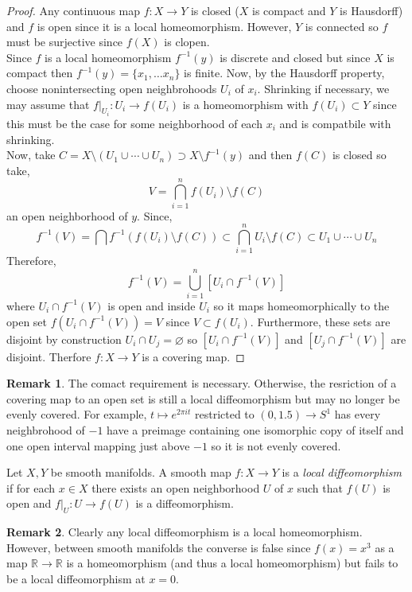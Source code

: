 \documentclass[12pt]{extarticle}
\newcommand{\R}{\mathbb{R}}
\theoremstyle{definition}
\newtheorem{remark}{Remark}
\newenvironment{definition}[1][Definition:]{\begin{trivlist}
\item[\hskip \labelsep {\bfseries #1}]}{\end{trivlist}}
\begin{document}
\begin{proof}
Any continuous map $f : X \to Y$ is closed ($X$ is compact and $Y$ is Hausdorff) and $f$ is open since it is a local homeomorphism. However, $Y$ is connected so $f$ must be surjective since $f(X)$ is clopen. 
\bigskip\\
Since $f$ is a local homeomorphism $f^{-1}(y)$ is discrete and closed but since $X$ is compact then $f^{-1}(y) = \{ x_1, \dots x_n \}$ is finite. Now, by the Hausdorff property, choose nonintersecting open neighbrohoods $U_i$ of $x_i$. Shrinking if necessary, we may assume that $f|_{U_i} : U_i \to f(U_i)$ is a homeomorphism with $f(U_i) \subset Y$ since this must be the case for some neighborhood of each $x_i$ and is compatbile with shrinking.  
\bigskip\\
Now, take $C = X \setminus (U_1 \cup \cdots \cup U_n) \supset X \setminus f^{-1}(y)$ and then $f(C)$ is closed so take,
\[ V = \bigcap_{i = 1}^n f(U_i) \setminus f(C) \]
an open neighborhood of $y$. Since,
\[ f^{-1}(V) = \bigcap f^{-1}(f(U_i) \setminus f(C)) \subset \bigcap_{i = 1}^n U_i \setminus f(C) \subset U_1 \cup \cdots \cup U_n \]
Therefore,
\[ f^{-1}(V) = \bigcup_{i = 1}^n [U_i \cap f^{-1}(V)] \]
where $U_i \cap f^{-1}(V)$ is open and inside $U_i$ so it maps homeomorphically to the open set $f(U_i \cap f^{-1}(V)) = V$ since $V \subset f(U_i)$. Furthermore, these sets are disjoint by construction $U_i \cap U_j = \varnothing$ so $[U_i \cap f^{-1}(V)]$ and $[U_j \cap f^{-1}(V)]$ are disjoint. Therfore $f : X \to Y$ is a covering map.
\end{proof}

\begin{remark}
The comact requirement is necessary. Otherwise, the resriction of a covering map to an open set is still a local diffeomorphism but may no longer be evenly covered. For example, $t \mapsto e^{2 \pi i t}$ restricted to $(0, 1.5) \to S^1$ has every neighbrohood of $-1$ have a preimage containing one isomorphic copy of itself and one open interval mapping just above $-1$ so it is not evenly covered.
\end{remark}

\begin{definition}
Let $X, Y$ be smooth manifolds. A smooth map $f : X \to Y$ is a \textit{local diffeomorphism} if for each $x \in X$ there exists an open neighborhood $U$ of $x$ such that $f(U)$ is open and $f|_U : U \to f(U)$ is a diffeomorphism.
\end{definition}

\begin{remark}
Clearly any local diffeomorphism is a local homeomorphism. However, between smooth manifolds the converse is false since $f(x) = x^3$ as a map $\R \to \R$ is a homeomorphism (and thus a local homeomorphism) but fails to be a local diffeomorphism at $x = 0$. 
\end{remark}
\end{document}
